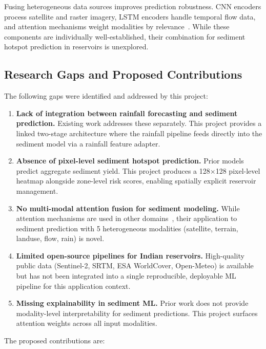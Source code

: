 \documentclass[twocolumn]{article}
\begin{document}
Fusing heterogeneous data sources improves prediction robustness. CNN encoders process satellite and raster imagery, LSTM encoders handle temporal flow data, and attention mechanisms weight modalities by relevance~\cite{xu2015, vaswani2017}. While these components are individually well-established, their combination for sediment hotspot prediction in reservoirs is unexplored.

\subsection{Research Gaps and Proposed Contributions}

The following gaps were identified and addressed by this project:

\begin{enumerate}
    \item \textbf{Lack of integration between rainfall forecasting and sediment prediction.} Existing work addresses these separately. This project provides a linked two-stage architecture where the rainfall pipeline feeds directly into the sediment model via a rainfall feature adapter.

    \item \textbf{Absence of pixel-level sediment hotspot prediction.} Prior models predict aggregate sediment yield. This project produces a 128$\times$128 pixel-level heatmap alongside zone-level risk scores, enabling spatially explicit reservoir management.

    \item \textbf{No multi-modal attention fusion for sediment modeling.} While attention mechanisms are used in other domains~\cite{xu2015}, their application to sediment prediction with 5 heterogeneous modalities (satellite, terrain, landuse, flow, rain) is novel.

    \item \textbf{Limited open-source pipelines for Indian reservoirs.} High-quality public data (Sentinel-2, SRTM, ESA WorldCover, Open-Meteo) is available but has not been integrated into a single reproducible, deployable ML pipeline for this application context.

    \item \textbf{Missing explainability in sediment ML.} Prior work does not provide modality-level interpretability for sediment predictions. This project surfaces attention weights across all input modalities.
\end{enumerate}

The proposed contributions are:
\end{document}
